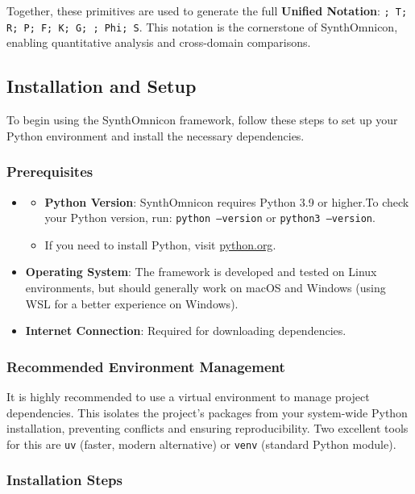 \documentclass[12pt,a4paper]{article}
\begin{document}
Together, these primitives are used to generate the full \textbf{Unified Notation}: \texttt{\langleD; T; R; P; F; K; G; \Gamma; Phi; S\rangle}. This notation is the cornerstone of SynthOmnicon, enabling quantitative analysis and cross-domain comparisons.

\subsection{Installation and Setup}

To begin using the SynthOmnicon framework, follow these steps to set up your Python environment and install the necessary dependencies.

\subsubsection{Prerequisites}

\begin{itemize}
    \item 
    \begin{itemize}
    \item \textbf{Python Version}: SynthOmnicon requires Python 3.9 or higher.To check your Python version, run: \texttt{python --version} or \texttt{python3 --version}.
    \item If you need to install Python, visit \href{}{python.org}.
\end{itemize}

    \item \textbf{Operating System}: The framework is developed and tested on Linux environments, but should generally work on macOS and Windows (using WSL for a better experience on Windows).
    \item \textbf{Internet Connection}: Required for downloading dependencies.
\end{itemize}

\subsubsection{Recommended Environment Management}

It is highly recommended to use a virtual environment to manage project dependencies. This isolates the project's packages from your system-wide Python installation, preventing conflicts and ensuring reproducibility. Two excellent tools for this are \texttt{uv} (faster, modern alternative) or \texttt{venv} (standard Python module).

\subsubsection{Installation Steps}
\end{document}
